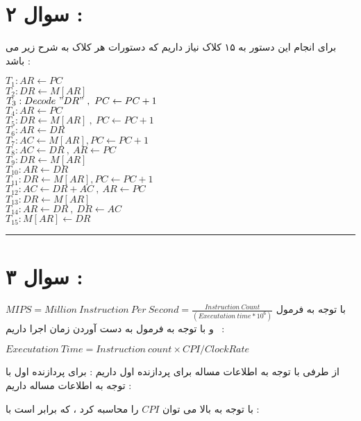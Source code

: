 \documentclass{article}
\begin{document}
\section*{سوال ۲ : }
برای انجام این دستور به ۱۵ کلاک نیاز داریم  که دستورات هر کلاک به شرح زیر می باشد  : 
\begin{center}
	$ T_1:AR \leftarrow PC$\\
	$ T_2 : DR \leftarrow M[AR]$\\
	$ T_3 : Decode  \ "DR"  \ ,  \ PC \leftarrow PC+1$\\
	$T_4 : AR \leftarrow PC$\\
	$T_5 : DR \leftarrow M[AR]  \  , \ PC \leftarrow PC+1$\\
	$T_6 : AR \leftarrow DR$\\
	$T_7 : AC \leftarrow M[AR] , PC \leftarrow PC +1$\\
	$T_8 : AC \leftarrow DR \ , \ AR \leftarrow PC $\\
	$ T_9 : DR \leftarrow M[AR]$\\
	$T_{10} : AR \leftarrow DR$\\
	$T_{11} : DR \leftarrow M[AR] , PC \leftarrow PC+1$\\
	$T_{12} : AC \leftarrow DR+AC  \  ,  \ AR \leftarrow PC$\\
	$T_{13} : DR \leftarrow M[AR]$\\
	$T_{14} : AR \leftarrow DR  \ , \ DR \leftarrow AC $\\
	$T_{15} : M[AR] \leftarrow DR$
\end{center}

\hrule
\section*{سوال ۳ : }
با توجه  به فرمول 
$MIPS = Million \ Inst
ruction \ Per \ Second = \frac{Instruction \  Count}{(Executation  \ time * 10 ^6)}$
 و با توجه به فرمول به دست آوردن زمان اجرا داریم  : 
\begin{center}
	$ Executation  \ Time  = Instruction \ count \times CPI / Clock Rate $
\end{center}
از طرفی با توجه به اطلاعات مساله  برای پردازنده اول داریم  :
برای پردازنده اول با توجه به اطلاعات مساله داریم  : 
\begin{center}
	\begin{table}[h]
		\centering
	\end{table}
\end{center}
با توجه به بالا می توان 
$CPI$
را محاسبه کرد ، که برابر است با   : 
\end{document}
